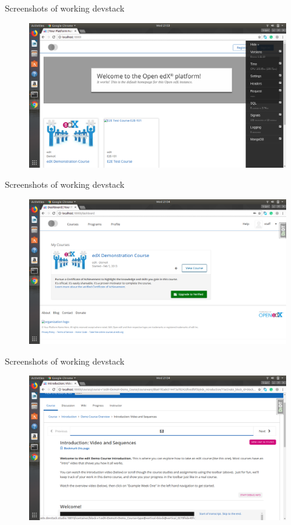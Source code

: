 \documentclass{beamer}
\begin{document}
	\begin{frame}{Screenshots of working devstack}
		\begin{figure}
			\includegraphics[width=\linewidth,height=\textheight,keepaspectratio]{./18-06-18/devstack-1.png}
		\end{figure}
	\end{frame}
	
	\begin{frame}{Screenshots of working devstack}
		\begin{figure}
			\includegraphics[width=\linewidth,height=\textheight,keepaspectratio]{./18-06-18/devstack-2.png}
		\end{figure}
	\end{frame}
	
	\begin{frame}{Screenshots of working devstack}
		\begin{figure}
			\includegraphics[width=\linewidth,height=\textheight,keepaspectratio]{./18-06-18/devstack-3.png}
		\end{figure}
	\end{frame}
	
\end{document}

